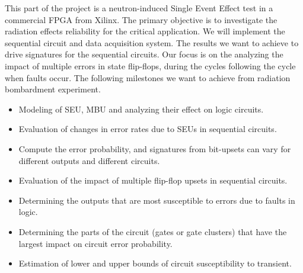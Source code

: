 This part of the project is a neutron-induced Single Event Effect test in a commercial FPGA from Xilinx. The primary objective is to investigate the radiation effects reliability for the critical application. We will implement the sequential circuit and data acquisition system. The results we want to achieve to drive signatures for the sequential circuits. Our focus is on the analyzing the impact of multiple errors in state flip-flops, during the cycles following the cycle when faults occur. The following milestones we want to achieve from radiation bombardment experiment.

\begin{itemize}
\item Modeling of SEU, MBU and analyzing their effect on logic circuits.
\item Evaluation of changes in error rates due to SEUs in sequential circuits.
\item Compute the error probability, and signatures from bit-upsets can vary for different outputs and different circuits. 
\item Evaluation of the impact of multiple flip-flop upsets in sequential circuits.
\item Determining the outputs that are most susceptible to errors due to faults in logic.
\item Determining the parts of the circuit (gates or gate clusters) that have the largest impact on circuit error probability.
\item Estimation of lower and upper bounds of circuit susceptibility to transient.
\end{itemize} 
%
%
%
